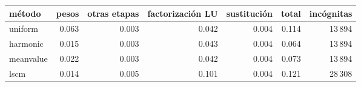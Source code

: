 \begin{tabular}{lrrrrrr}
\toprule
método & pesos & otras etapas & factorización LU & sustitución & total & incógnitas \\
\midrule
uniform & 0.063 & 0.003 & 0.042 & 0.004 & 0.114 & 13\,894 \\
harmonic & 0.015 & 0.003 & 0.043 & 0.004 & 0.064 & 13\,894 \\
meanvalue & 0.022 & 0.003 & 0.042 & 0.004 & 0.073 & 13\,894 \\
lscm & 0.014 & 0.005 & 0.101 & 0.004 & 0.121 & 28\,308 \\
\bottomrule
\end{tabular}
